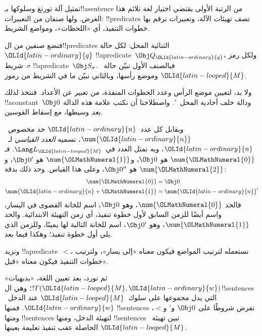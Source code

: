 \documentclass[../../../include/open-logic-section]{subfiles}
\begin{document}

\begin{explain}
تمثيل آلة تورنغ وسلوكها بـ!!a{sentence} من الرتبة الأولى يقتضي
اختيار لغة تلائم هذا الغرض. ولها صنفان من التعبيرات:
!!{predicate}s تصف تهيئات الآلة، وتعبيرات نرقم بها خطوات التنفيذ،
أي «اللحظات»، ومواضع الشريط.

فنضع صنفين من ال!!{predicate}s الثنائية المحل: لكل حالة~$\OLId{latin-ordinary}{q}$
!!a{predicate}~$\Obj Q_\OLId{latin-ordinary}{q}$، ولكل رمز شريط~$\sigma$
!!a{predicate}~$\Obj S_\sigma$. فبالصنف الأول نبيّن حالة~$\OLId{latin-looped}{M}$
وموضع رأسها، وبالثاني نبيّن ما في الشريط من رموز.

ولا بد، لتعيين موضع الرأس وعدد الخطوات المنفذة، من تعبير عن
الأعداد. فنتخذ لذلك !!a{constant}~$\Obj 0$ ودالة خلف أحادية
المحل~$\prime$. واصطلاحنا أن نكتب علامة هذه الدالة \emph{بعد}
وسيطها، مع إسقاط القوسين.

ويقابل كل عدد~$\OLId{latin-ordinary}{n}$ حد مخصوص~$\num{\OLId{latin-ordinary}{n}}$، نسميه
\emph{العدد القياسي} لـ~$\OLId{latin-ordinary}{n}$، وبه نمثل العدد في~$\Lang L_\OLId{latin-looped}{M}$.
فـ$\num{\OLMathNumeral{0}}$ هو $\Obj 0$، و$\num{\OLMathNumeral{1}}$ هو $\Obj 0'$،
و$\num{\OLMathNumeral{2}}$ هو $\Obj 0''$، وعلى هذا القياس. وحد ذلك بدقة:
\begin{align*}
\num{\OLMathNumeral{0}} & = \Obj 0 \\
\num{\OLId{latin-ordinary}{n}+\OLMathNumeral{1}} &= \num{\OLId{latin-ordinary}{n}}'
\end{align*}
فالحد $\num{\OLMathNumeral{0}}$، وهو $\Obj 0$، اسم للخانة القصوى في اليسار،
واسم أيضًا للزمن السابق لأول خطوة تنفيذ، أي زمن التهيئة الابتدائية.
والحد $\num{\OLMathNumeral{1}}$، وهو $\Obj 0'$، اسم للخانة التالية لها يمينًا،
وللزمن الذي يلي أول خطوة تنفيذ؛ وهكذا فيما بعد.

ونزيد !!a{predicate}~$<$، نستعمله لترتيب المواضع فيكون معناه
«إلى يسار»، ولترتيب خطوات التنفيذ فيكون معناه «قبل».

ثم نورد، بعد تعيين اللغة، «بديهيات» $!T(\OLId{latin-looped}{M},\OLId{latin-ordinary}{w})$؛ وهي
ال!!{sentence}s التي يدل مجموعها على سلوك~$\OLId{latin-looped}{M}$ عند الدخل~$\OLId{latin-ordinary}{w}$.
فمنها !!{sentence}s تفرض شروطًا على $\Obj 0$ و$\prime$ و$<$،
ومنها !!{sentence}s لتهيئة الدخل، ومنها !!{sentence}s تبين
تهيئة~$\OLId{latin-looped}{M}$ الحاصلة عقب تنفيذ تعليمة بعينها.
\end{explain}
\end{document}

